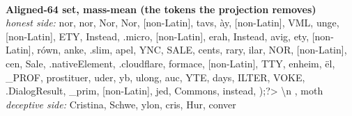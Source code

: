 \\[3pt]
\textbf{Aligned-64 set, mass-mean (the tokens the projection removes)} \\[3pt]
\emph{honest side:} \textrm{nor}, \textrm{ nor}, \textrm{ Nor}, \textrm{Nor}, \textrm{[non-Latin]}, \textrm{ tavs}, \textrm{ày}, \textrm{[non-Latin]}, \textrm{VML}, \textrm{unge}, \textrm{[non-Latin]}, \textrm{ETY}, \textrm{ Instead}, \textrm{.micro}, \textrm{[non-Latin]}, \textrm{erah}, \textrm{Instead}, \textrm{avig}, \textrm{ety}, \textrm{[non-Latin]}, \textrm{ równ}, \textrm{anke}, \textrm{.slim}, \textrm{apel}, \textrm{YNC}, \textrm{ SALE}, \textrm{cents}, \textrm{rary}, \textrm{ilar}, \textrm{ NOR}, \textrm{[non-Latin]}, \textrm{cen}, \textrm{ Sale}, \textrm{.nativeElement}, \textrm{.cloudflare}, \textrm{formace}, \textrm{[non-Latin]}, \textrm{TTY}, \textrm{enheim}, \textrm{ël}, \textrm{\_PROF}, \textrm{ prostituer}, \textrm{uder}, \textrm{yb}, \textrm{ ulong}, \textrm{auc}, \textrm{YTE}, \textrm{days}, \textrm{ILTER}, \textrm{VOKE}, \textrm{.DialogResult}, \textrm{\_prim}, \textrm{[non-Latin]}, \textrm{jed}, \textrm{ Commons}, \textrm{instead}, \textrm{);?> \textbackslash n }, \textrm{moth} \\[3pt]
\emph{deceptive side:} \textrm{ Cristina}, \textrm{ Schwe}, \textrm{ylon}, \textrm{ cris}, \textrm{ Hur}, \textrm{ conver}
